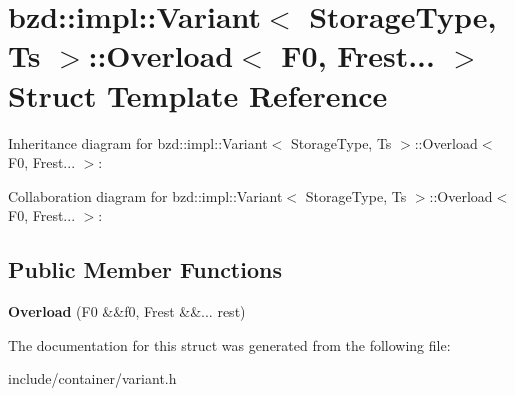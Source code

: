 \hypertarget{structbzd_1_1impl_1_1Variant_1_1Overload_3_01F0_00_01Frest_8_8_8_01_4}{}\section{bzd\+:\+:impl\+:\+:Variant$<$ Storage\+Type, Ts $>$\+:\+:Overload$<$ F0, Frest... $>$ Struct Template Reference}
\label{structbzd_1_1impl_1_1Variant_1_1Overload_3_01F0_00_01Frest_8_8_8_01_4}


Inheritance diagram for bzd\+:\+:impl\+:\+:Variant$<$ Storage\+Type, Ts $>$\+:\+:Overload$<$ F0, Frest... $>$\+:


Collaboration diagram for bzd\+:\+:impl\+:\+:Variant$<$ Storage\+Type, Ts $>$\+:\+:Overload$<$ F0, Frest... $>$\+:
\subsection*{Public Member Functions}
\begin{DoxyCompactItemize}
\item 
\mbox{\label{structbzd_1_1impl_1_1Variant_1_1Overload_3_01F0_00_01Frest_8_8_8_01_4_aa342e3bb3c6008462be2f746d1f4b564}} 
{\bfseries Overload} (F0 \&\&f0, Frest \&\&... rest)
\end{DoxyCompactItemize}


The documentation for this struct was generated from the following file\+:\begin{DoxyCompactItemize}
\item 
include/container/variant.\+h\end{DoxyCompactItemize}

